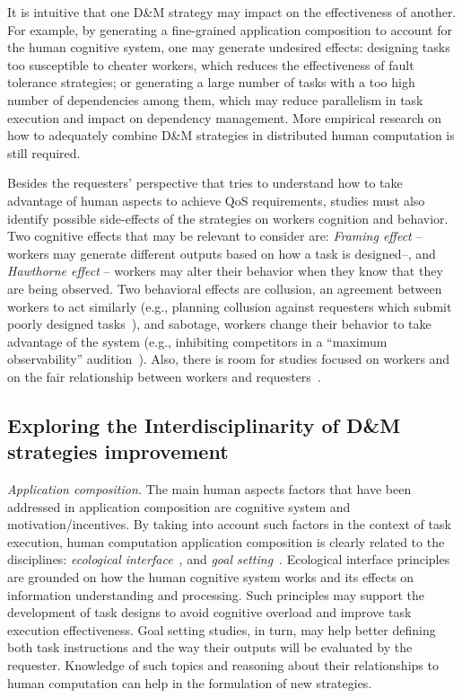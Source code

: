 \documentclass[11pt]{bmc_article_s50}
\begin{document}
It is intuitive that one D\&M strategy may impact on the effectiveness of another. For example, by generating a fine-grained application composition to account for the human cognitive system, one may generate undesired effects:  designing tasks too susceptible to cheater workers, which reduces the effectiveness of fault tolerance strategies; or  generating a large number of tasks with a too high number of dependencies among them, which may reduce parallelism in task execution and impact on dependency management. More empirical research on how to adequately combine D\&M strategies in distributed human computation is still required.

Besides the requesters' perspective that tries to understand how to take advantage of human aspects to achieve QoS requirements, studies must also identify possible side-effects of the strategies on workers cognition and behavior. Two cognitive effects that may be relevant to consider are: \textit{Framing effect} -- workers may generate different outputs based on how a task is designed--, and \textit{Hawthorne effect} -- workers may alter their behavior when they know that they are being observed. Two behavioral effects are collusion, an agreement between workers to act similarly (e.g., planning collusion against requesters which submit poorly designed tasks~\cite{Kulkarni2012}), and sabotage, workers change their behavior to take advantage of the system (e.g., inhibiting competitors in a ``maximum observability'' audition~\cite{Archak:2010}). Also, there is room for studies focused on workers and on the fair relationship between workers and requesters~\cite{Silberman:2010}. 

\subsection{Exploring the Interdisciplinarity of D\&M strategies improvement}

\textit{Application composition.} The main human aspects factors that have been addressed in application composition are cognitive system and motivation/incentives. By taking into account such factors in the context of task execution, human computation application composition is clearly related to the disciplines: \textit{ecological interface}~\cite{Rasmussen:1989}, and \textit{goal setting}~\cite{Locke:2002}. Ecological interface principles are grounded on how the human cognitive system works and its effects on information understanding and processing. Such principles may support the development of task designs to avoid cognitive overload and improve task execution effectiveness. Goal setting studies, in turn, may help better defining both task instructions and the way their outputs will be evaluated by the requester. Knowledge of such topics and reasoning about their relationships to human computation can help in the formulation of new strategies.
\end{document}
